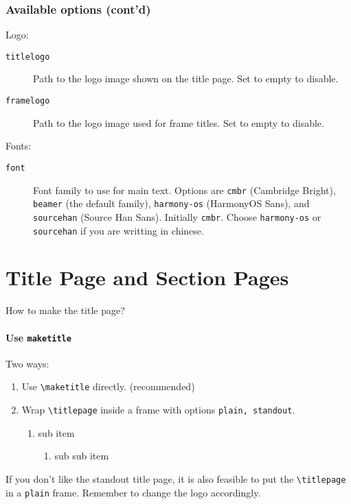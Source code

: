\documentclass[no-math, aspectratio=1610, 10pt]{beamer}
\begin{document}
    \begin{frame}
        \frametitle{Available options (cont'd)}

        Logo:
        \begin{description}
            \item[\texttt{titlelogo}] Path to the logo image shown on the title page. Set to empty to disable.
            \item[\texttt{framelogo}] Path to the logo image used for frame titles. Set to empty to disable. 
        \end{description}
    
        Fonts:
        \begin{description}
            \item[\texttt{font}] Font family to use for main text. Options are \texttt{cmbr} (Cambridge Bright), \texttt{beamer} (the default family), \texttt{harmony-os} (HarmonyOS Sans), and \texttt{sourcehan} (Source Han Sans). Initially \texttt{cmbr}. Choose \texttt{harmony-os} or \texttt{sourcehan} if you are writting in chinese.
        \end{description}
    \end{frame}

    \section{Title Page and Section Pages}

    \begin{frame}[fragile]{How to make the title page?}
        \framesubtitle{Use \texttt{maketitle}}
        Two ways:
        \begin{enumerate}
            \item Use \verb|\maketitle| directly. (recommended)
            \item Wrap \verb|\titlepage| inside a frame with options \texttt{plain, standout}.
            \begin{enumerate}
                \item sub item
                \begin{enumerate}
                    \item sub sub item
                \end{enumerate}
            \end{enumerate}
        \end{enumerate}

        If you don't like the standout title page, it is also feasible to put the \verb|\titlepage| in a \texttt{plain} frame. Remember to change the logo accordingly.
    \end{frame}
\end{document}
